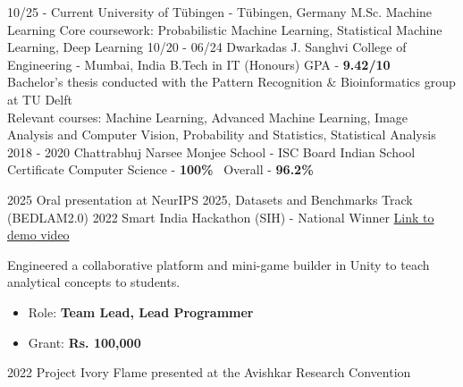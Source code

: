 \documentclass[9pt]{developercv} %
\begin{document}
\vspace{-10 pt}
\begin{entrylist}
    \entry
        {10/25 - Current}
        {University of T\"ubingen - T\"ubingen, Germany}
        {M.Sc. Machine Learning}
        {Core coursework: Probabilistic Machine Learning, Statistical Machine Learning, Deep Learning}
    \entry
        {10/20 - 06/24}
        {Dwarkadas J. Sanghvi College of Engineering - Mumbai, India}
        {B.Tech in IT (Honours)}
        {GPA - \textbf{9.42/10}
        \\ Bachelor's thesis conducted with the Pattern Recognition \& Bioinformatics group at TU Delft
        \\ Relevant courses: Machine Learning, Advanced Machine Learning, Image Analysis and Computer Vision, Probability and Statistics, Statistical Analysis}
    \entry
        {2018 - 2020}
        {Chattrabhuj Narsee Monjee School - ISC Board}
        {Indian School Certificate}
        {Computer Science - \textbf{100\%} \textbullet\ Overall - \textbf{96.2\%}}
\end{entrylist}

\vspace{-10 pt}
\begin{entrylist}
    \entry
        {2025}
        {Oral presentation at NeurIPS 2025, Datasets and Benchmarks Track (BEDLAM2.0)}
        {}
        {}
    \entry
        {2022}
        {Smart India Hackathon (SIH) - National Winner}
        {\href{https://prerana-achar.github.io/assets/resources/SIH.mp4}{Link to demo video}}
        {
        Engineered a collaborative platform and mini-game builder in Unity to teach analytical concepts to students.
        \begin{itemize}[noitemsep,topsep=0pt,parsep=0pt,partopsep=0pt, leftmargin=-1pt]
            \item Role: \textbf{Team Lead, Lead Programmer}
            \item Grant: \textbf{Rs. 100,000}
        \end{itemize}
        }
    \entry
        {2022}
        {Project Ivory Flame presented at the Avishkar Research Convention}
        {}
        {}
\end{entrylist}
\end{document}
